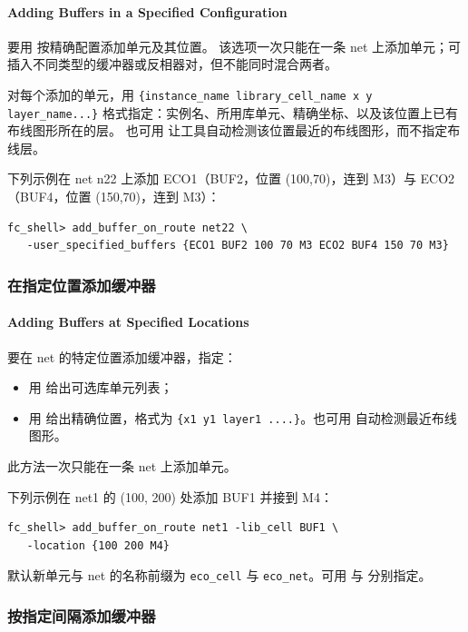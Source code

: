 \paragraph*{Adding Buffers in a Specified Configuration}

要用  按精确配置添加单元及其位置。
该选项一次只能在一条 net 上添加单元；可插入不同类型的缓冲器或反相器对，但不能同时混合两者。

对每个添加的单元，用 \texttt{\{instance\_name library\_cell\_name x y layer\_name...\}} 格式指定：实例名、所用库单元、精确坐标、以及该位置上已有布线图形所在的层。
也可用  让工具自动检测该位置最近的布线图形，而不指定布线层。

下列示例在 net n22 上添加 ECO1（BUF2，位置 (100,70)，连到 M3）与 ECO2（BUF4，位置 (150,70)，连到 M3）：
\begin{lstlisting}
fc_shell> add_buffer_on_route net22 \
   -user_specified_buffers {ECO1 BUF2 100 70 M3 ECO2 BUF4 150 70 M3}
\end{lstlisting}

\subsubsection{在指定位置添加缓冲器}
\paragraph*{Adding Buffers at Specified Locations}

要在 net 的特定位置添加缓冲器，指定：
\begin{itemize}
  \item 用  给出可选库单元列表；
  \item 用  给出精确位置，格式为 \texttt{\{x1 y1 layer1 ....\}}。也可用  自动检测最近布线图形。
\end{itemize}
此方法一次只能在一条 net 上添加单元。

下列示例在 net1 的 (100, 200) 处添加 BUF1 并接到 M4：
\begin{lstlisting}
fc_shell> add_buffer_on_route net1 -lib_cell BUF1 \
   -location {100 200 M4}
\end{lstlisting}

默认新单元与 net 的名称前缀为 \texttt{eco\_cell} 与 \texttt{eco\_net}。可用  与  分别指定。

\subsubsection{按指定间隔添加缓冲器}
